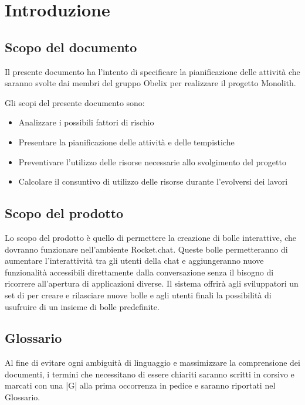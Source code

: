 \section{Introduzione}

\subsection{Scopo del documento}

Il presente documento ha l’intento di specificare la pianificazione delle attività che saranno svolte dai membri del gruppo Obelix per realizzare il progetto Monolith.

Gli scopi del presente documento sono:
\begin{itemize}
\item Analizzare i possibili fattori di rischio
\item Presentare la pianificazione delle attività e delle tempistiche
\item Preventivare l'utilizzo delle risorse necessarie allo svolgimento del progetto
\item Calcolare il consuntivo di utilizzo delle risorse durante l'evolversi dei lavori
\end{itemize}

\subsection{Scopo del prodotto}

Lo scopo del prodotto è quello di permettere la creazione di bolle
interattive, che dovranno funzionare nell’ambiente Rocket.chat. Queste
bolle permetteranno di aumentare l'interattività tra gli utenti della
chat e aggiungeranno nuove funzionalità accessibili
direttamente dalla conversazione senza il bisogno di ricorrere
all'apertura di applicazioni diverse.
Il sistema offrirà agli sviluppatori un set di  per creare e
rilasciare nuove bolle e agli utenti finali la possibilità di
usufruire di un insieme di bolle predefinite.

\subsection{Glossario}

Al fine di evitare ogni ambiguità di linguaggio e massimizzare la
comprensione dei documenti, i termini che necessitano di essere
chiariti saranno scritti in corsivo e marcati con una |G| alla prima
occorrenza in pedice e
saranno riportati nel Glossario.

